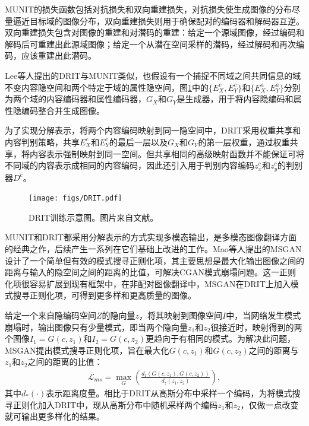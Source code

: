 MUNIT的损失函数包括对抗损失和双向重建损失，对抗损失使生成图像的分布尽量逼近目标域的图像分布，双向重建损失则用于确保配对的编码器和解码器互逆。双向重建损失包含对图像的重建和对潜码的重建：给定一个源域图像，经过编码和解码后可重建出此源域图像；给定一个从潜在空间采样的潜码，经过解码和再次编码，应该重建出此潜码。

Lee等人提出的DRIT\cite{lee2018diverse}与MUNIT类似，也假设有一个捕捉不同域之间共同信息的域不变内容隐空间和两个特定于域的属性隐空间，图\ref{DRIT}中的$\{E_X^c, E_Y^c\}$和$\{E_X^a, E_Y^a\}$分别为两个域的内容编码器和属性编码器，$G_X$和$G_Y$是生成器，用于将内容隐编码和属性隐编码整合并生成图像。

为了实现分解表示，将两个内容编码映射到同一隐空间中，DRIT采用权重共享和内容判别策略，共享$E_X^c$和$E_Y^c$的最后一层以及$G_{X}$和$G_{Y}$的第一层权重，通过权重共享，将内容表示强制映射到同一空间。但共享相同的高级映射函数并不能保证可将不同域的内容表示成相同的内容编码，因此还引入用于判别内容编码$z_x^c$和$z_y^c$的判别器$D^c$。

\begin{figure}[ht]
    \centering
	\texttt{[image: figs/DRIT.pdf]}
	\caption{DRIT训练示意图。图片来自文献\cite{lee2018diverse}。}
	\label{DRIT}
\end{figure}

MUNIT和DRIT都采用分解表示的方式实现多模态输出，是多模态图像翻译方面的经典之作，后续产生一系列在它们基础上改进的工作。Mao等人提出的MSGAN\cite{mao2019mode}设计了一个简单但有效的模式搜寻正则化项，其主要思想是最大化输出图像之间的距离与输入的隐空间之间的距离的比值，可解决CGAN模式崩塌问题。这一正则化项很容易扩展到现有框架中，在非配对图像翻译中，MSGAN在DRIT上加入模式搜寻正则化项，可得到更多样和更高质量的图像。

给定一个来自隐编码空间$Z$的隐向量$z$，将其映射到图像空间$I$中，当网络发生模式崩塌时，输出图像只有少量模式，即当两个隐向量$z_1$和$z_2$很接近时，映射得到的两个图像$I_1=G(c,z_1)$和$I_2=G(c,z_2)$更趋向于有相同的模式。为解决此问题，MSGAN提出模式搜寻正则化项，旨在最大化$G(c,z_1)$和$G(c,z_2)$之间的距离与$z_1$和$z_2$之间的距离的比值：
\begin{equation}
\begin{split} 
\mathcal{L}_{ms}=\max\limits_{G}(\frac{d_I(G(c,z_1),G(c,z_2))}{d_z(z_1,z_2)}),
\end{split}
\label{eq:MSGAN}
\end{equation}
其中$d_{\ast}(\cdot)$表示距离度量。相比于DRIT从高斯分布中采样一个编码，为将模式搜寻正则化加入DRIT中，现从高斯分布中随机采样两个编码$z_1$和$z_2$，仅做一点改变就可输出更多样化的结果。

